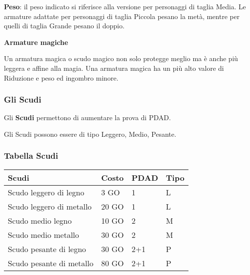 \documentclass[12pt,a4paper,twoside,openany]{book}
\begin{document}
\begin{multicols}{2}
\textbf{Peso}: il peso indicato si riferisce alla versione per personaggi di taglia Media. Le armature adattate per personaggi di taglia Piccola pesano la metà, mentre per quelli di taglia Grande pesano il doppio.

\textbf{Armature magiche}

Un armatura magica o scudo magico non solo protegge meglio ma è anche più leggera e affine alla magia. Una armatura magica ha un più alto valore di Riduzione e peso ed ingombro minore.

\subsubsection{Gli Scudi}

Gli \textbf{Scudi} permettono di aumentare la prova di PDAD. 

Gli Scudi possono essere di tipo Leggero, Medio, Pesante.

\end{multicols}

\subsubsection{Tabella Scudi}

\label{tabella-scudi}

\begin{center}
	\begin{tabular}{llll}
\textbf{Scudi} & \textbf{Costo} & \textbf{PDAD} & \textbf{Tipo}\\
\toprule
Scudo leggero di legno 		& 3 GO   &  1	& L\\
Scudo leggero di metallo 	& 20 GO  &  1 	& L\\
Scudo medio legno			& 10 GO  &  2	& M\\
Scudo medio metallo 		& 30 GO  &  2  	& M\\
Scudo pesante di legno 		& 30 GO  &  2+1 & P\\
Scudo pesante di metallo	& 80 GO  &  2+1 & P\\
\end{tabular}

\end{center}
\end{document}

